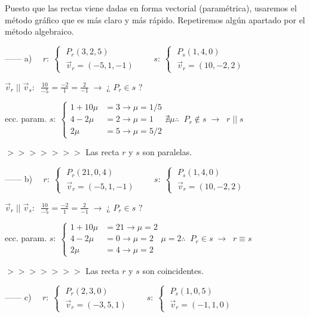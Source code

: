  Puesto que las rectas viene dadas en forma vectorial (paramétrica), usaremos el método gráfico que es más claro y más rápido. Repetiremos algún apartado por el método algebraico.
 

\noindent ------ a) $\quad r:\; \begin{cases} \; P_r(3,2,5) \\ \; \vec v_r=(-5,1,-1) \end{cases} \qquad s:\; \begin{cases} \; P_s(1,4,0) \\ \; \vec v_r=(10,-2,2) \end{cases}$


\noindent $\vec v_r \; || \; \vec v_s:\;\; \frac {10}{-5}=\frac {-2}{1}=\frac {2}{-1}\; \to \; \text{¿ } P_r \in s \text{ ?}$

\noindent ecc. param. $s:\;\begin{cases} 1+10\mu &=3 \to \mu=1/5 \\
4-2\mu &= 2 \to \mu=1\\ 2\mu &=5 \to \mu=5/2 	\end{cases} \nexists \mu \therefore \;\; P_r \notin s \;\to\; \boxed{\;r\;||\;s\;}$

$>>>>>>>$ Las recta $r$ y $s$ son paralelas.

\noindent ------ b) $\quad r:\; \begin{cases} \; P_r(21,0,4) \\ \; \vec v_r=(-5,1,-1) \end{cases} \qquad s:\; \begin{cases} \; P_s(1,4,0) \\ \; \vec v_r=(10,-2,2) \end{cases}$


\noindent $\vec v_r \; || \; \vec v_s:\;\; \frac {10}{-5}=\frac {-2}{1}=\frac {2}{-1}\; \to \; \text{¿ } P_r \in s \text{ ?}$

\noindent ecc. param. $s:\;\begin{cases} 1+10\mu &=21 \to \mu=2 \\
4-2\mu &= 0 \to \mu=2\\ 2\mu &=4 \to \mu=2 	\end{cases}  \mu=2 \therefore \;\; P_r \in s \;\to\; \boxed{\;r \equiv s\;}$

$>>>>>>>$ Las recta $r$ y $s$ son coincidentes.

\noindent ------ c) $\quad r:\; \begin{cases} \; P_r(2,3,0) \\ \; \vec v_r=(-3,5,1) \end{cases} \qquad s:\; \begin{cases} \; P_s(1,0,5) \\ \; \vec v_r=(-1,1,0) \end{cases}$


